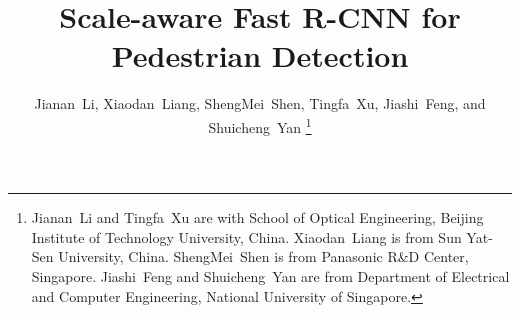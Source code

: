 \documentclass[journal]{IEEEtran}
\begin{document}
 
\title{Scale-aware Fast R-CNN for Pedestrian Detection}
 

\author{Jianan~Li,
        Xiaodan~Liang,
        ShengMei~Shen,
        Tingfa~Xu,
        Jiashi~Feng,
        and Shuicheng~Yan%
\thanks{Jianan~Li and Tingfa~Xu are with School of Optical Engineering, Beijing Institute of Technology University, China. 
Xiaodan~Liang is from Sun Yat-Sen University, China.
ShengMei~Shen is from Panasonic R\&D Center, Singapore. 
Jiashi~Feng and Shuicheng~Yan are from Department of Electrical and Computer Engineering, National University of Singapore.
}%
}




\maketitle
\end{document}
